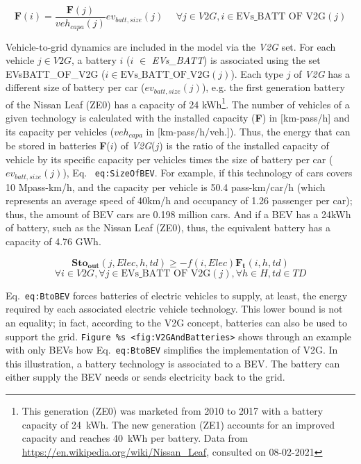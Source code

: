 \documentclass[
]{article}
\begin{document}
{\[\textbf{F} (i) = \frac{\textbf{F} (j)}{ veh_{capa} (j)} ev_{batt,size} (j)  ~~~~~~ \forall  j \in  V2G, i \in \text{EVs_BATT OF V2G}(j)\]}

Vehicle-to-grid dynamics are included in the model via the \emph{V2G}
set. For each vehicle \(j \in V2G\), a battery \(i\) (\(i\) \(\in\)
\emph{EVs\_BATT}) is associated using the set
EVs\label{batt_of_v2g}{BATT\_OF\_V2G}
(\(i \in \text{EVs_BATT_OF_V2G}(j)\)). Each type \(j\) of \emph{V2G} has
a different size of battery per car (\(ev_{batt,size}(j)\)), e.g. the
first generation battery of the Nissan Leaf (ZE0) has a capacity of 24
kWh\footnote{This generation (ZE0) was marketed from 2010 to 2017 with a
  battery capacity of 24~kWh. The new generation (ZE1) accounts for an
  improved capacity and reaches 40~kWh per battery. Data from
  \url{https://en.wikipedia.org/wiki/Nissan_Leaf}, consulted on
  08-02-2021}. The number of vehicles of a given technology is
calculated with the installed capacity (\textbf{F}) in {[}km-pass/h{]}
and its capacity per vehicles (\(veh_{capa}\) in {[}km-pass/h/veh.{]}).
Thus, the energy that can be stored in batteries \textbf{F}(\(i\)) of
\emph{V2G}(\(j\)) is the ratio of the installed capacity of vehicle by
its specific capacity per vehicles times the size of battery per car
(\(ev_{batt,size}(j)\)), Eq.~ \texttt{eq:SizeOfBEV}. For example, if
this technology of cars covers 10 Mpass-km/h, and the capacity per
vehicle is 50.4 pass-km/car/h (which represents an average speed of
40km/h and occupancy of 1.26 passenger per car); thus, the amount of BEV
cars are 0.198 million cars. And if a BEV has a 24kWh of battery, such
as the Nissan Leaf (ZE0), thus, the equivalent battery has a capacity of
4.76 GWh.

{\[\textbf{Sto}_\textbf{out} (j,Elec,h,td) \geq - f(i,Elec) \textbf{F}_\textbf{t} (i,h,td)\]\[\forall i \in V2G , \forall j \in \text{EVs_BATT OF V2G}(j), \forall h \in H, td \in TD\]}

Eq.~\texttt{eq:BtoBEV} forces batteries of electric vehicles to supply,
at least, the energy required by each associated electric vehicle
technology. This lower bound is not an equality; in fact, according to
the V2G concept, batteries can also be used to support the grid.
\texttt{Figure\ \%s\ \textless{}fig:V2GAndBatteries\textgreater{}} shows
through an example with only BEVs how Eq.~\texttt{eq:BtoBEV} simplifies
the implementation of V2G. In this illustration, a battery technology is
associated to a BEV. The battery can either supply the BEV needs or
sends electricity back to the grid.
\end{document}
